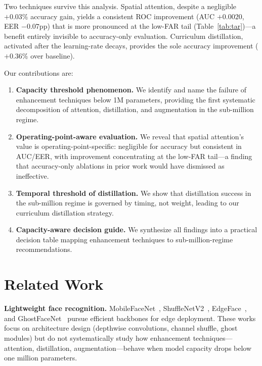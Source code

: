 \documentclass[journal,10pt]{IEEEtran}
\begin{document}
Two techniques survive this analysis. Spatial attention, despite a negligible $+0.03\%$ accuracy gain, yields a consistent ROC improvement (AUC $+0.0020$, EER $-0.07$pp) that is more pronounced at the low-FAR tail (Table~\ref{tab:tar})---a benefit entirely invisible to accuracy-only evaluation. Curriculum distillation, activated after the learning-rate decays, provides the sole accuracy improvement ($+0.36\%$ over baseline).

Our contributions are:

\begin{enumerate}
\item \textbf{Capacity threshold phenomenon.} We identify and name the failure of enhancement techniques below 1M parameters, providing the first systematic decomposition of attention, distillation, and augmentation in the sub-million regime.
\item \textbf{Operating-point-aware evaluation.} We reveal that spatial attention's value is operating-point-specific: negligible for accuracy but consistent in AUC/EER, with improvement concentrating at the low-FAR tail---a finding that accuracy-only ablations in prior work would have dismissed as ineffective.
\item \textbf{Temporal threshold of distillation.} We show that distillation success in the sub-million regime is governed by timing, not weight, leading to our curriculum distillation strategy.
\item \textbf{Capacity-aware decision guide.} We synthesize all findings into a practical decision table mapping enhancement techniques to sub-million-regime recommendations.
\end{enumerate}

\section{Related Work}
\label{sec:related}

\textbf{Lightweight face recognition.} MobileFaceNet~\cite{mobilefacenet}, ShuffleNetV2~\cite{shufflenetv2}, EdgeFace~\cite{edgeface}, and GhostFaceNet~\cite{ghostfacenet} pursue efficient backbones for edge deployment. These works focus on architecture design (depthwise convolutions, channel shuffle, ghost modules) but do not systematically study how enhancement techniques---attention, distillation, augmentation---behave when model capacity drops below one million parameters.
\end{document}
